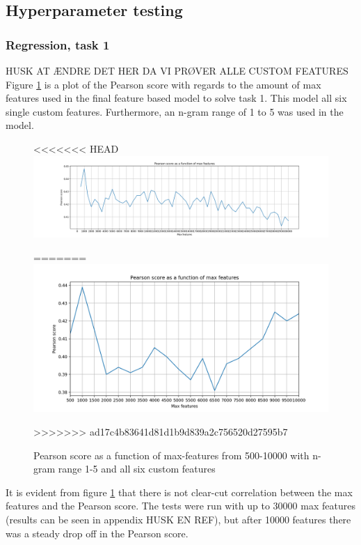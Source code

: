 \subsection{Hyperparameter testing}
\subsubsection{Regression, task 1}
HUSK AT ÆNDRE DET HER DA VI PRØVER ALLE CUSTOM FEATURES\\
Figure \ref{fig:max_f_ngram15_hashtag} is a plot of the Pearson score with regards to the amount of max features used in the final feature based model to solve task 1. This model all six single custom features. Furthermore, an n-gram range of 1 to 5 was used in the model.
\begin{figure}[H]
    \centering
<<<<<<< HEAD
        \includegraphics[width=\textwidth]{pictures/max_f_pearson.png}
        \caption{Pearson score as a function of max-features from 500-30000 with n-gram range 1-5 and all the custom features on}
        \label{fig:max_f_pearson}
=======
        \includegraphics[width=\textwidth]{pictures/max_f_ngram15_hashtag.png}
        \caption{Pearson score as a function of max-features from 500-10000 with n-gram range 1-5 and all six custom features}
        \label{fig:max_f_ngram15_hashtag}
>>>>>>> ad17c4b83641d81d1b9d839a2c756520d27595b7
\end{figure}
It is evident from figure \ref{fig:max_f_ngram15_hashtag} that there is not clear-cut correlation between the max features and the Pearson score. The tests were run with up to 30000 max features (results can be seen in appendix HUSK EN REF), but after 10000 features there was a steady drop off in the Pearson score.\\
